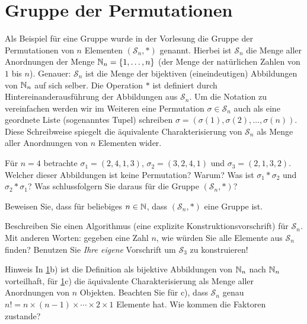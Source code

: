 \documentclass{scrartcl}
\newcommand{\permN}{\mathcal{S}_n}
\begin{document}
\maketitle

\section{Gruppe der Permutationen }
\label{groupperm}
Als Beispiel für eine Gruppe wurde in der Vorlesung die Gruppe der Permutationen von $n$ Elementen $(\permN{}, \ast)$ genannt.
Hierbei ist $\permN$ die Menge aller Anordnungen der Menge $\mathbb{N}_n = \{1,\ldots,n\}$ (der Menge der natürlichen Zahlen von $1$ bis $n$).
Genauer: $\permN$ ist die Menge der bijektiven (eineindeutigen) Abbildungen von $\mathbb{N}_n$ auf sich selber.
Die Operation $\ast$ ist definiert durch Hintereinanderausführung der Abbildungen aus $\permN$.
Um die Notation zu vereinfachen werden wir im Weiteren eine Permutation $\sigma \in \permN$ auch als eine geordnete Liste (sogenanntes Tupel) schreiben $\sigma = (\sigma(1), \sigma(2), \ldots, \sigma(n))$.
Diese Schreibweise spiegelt die äquivalente Charakterisierung von $\permN$ als Menge aller Anordnungen von $n$ Elementen wider.
\begin{subex}
  \item{} Für $n=4$ betrachte $\sigma_1 = (2, 4, 1, 3)$, $\sigma_2 = (3, 2, 4 , 1)$ und $\sigma_3 = (2, 1, 3, 2)$.
  Welcher dieser Abbildungen ist keine Permutation?
  Warum?
  Was ist $\sigma_1 \ast \sigma_2$ und $\sigma_2 \ast \sigma_1$?
  Was schlussfolgern Sie daraus für die Gruppe $(\permN,\ast)$?
  \item{} Beweisen Sie, dass für beliebiges $n \in \mathbb{N}$, dass $(\permN,\ast)$ eine Gruppe ist.
  \item{} Beschreiben Sie einen Algorithmus (eine explizite Konstruktionsvorschrift) für $\permN$.
  Mit anderen Worten: gegeben eine Zahl $n$, wie würden Sie alle Elemente aus $\permN$ finden?
  Benutzen Sie \emph{Ihre eigene} Vorschrift um $\mathcal{S}_3$ zu konstruieren!
\end{subex}
\begin{remark}{Hinweis}
  In \ref{groupperm}b) ist die Definition als bijektive Abbildungen von $\mathbb{N}_n$ nach $\mathbb{N}_n$ vorteilhaft, für  \ref{groupperm}c) die äquivalente Charakterisierung als Menge aller Anordnungen von $n$ Objekten.
  Beachten Sie für c), dass $\permN$ genau $n! = n \times (n-1) \times \cdots \times 2 \times 1$ Elemente hat.
  Wie kommen die Faktoren zustande?
\end{remark}
\end{document}
